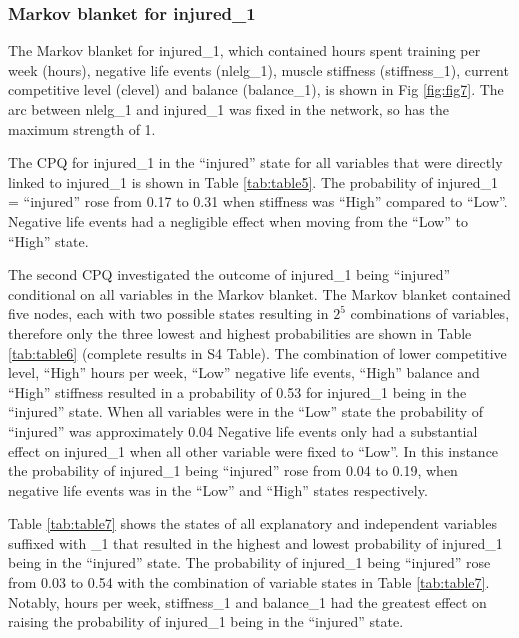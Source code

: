 \documentclass[
]{frontiersHLTH}
\begin{document}
\hypertarget{markov-blanket-for-injured_1}{%
\subsubsection{Markov blanket for
injured\_1}\label{markov-blanket-for-injured_1}}

The Markov blanket for injured\_1, which contained hours spent training
per week (hours), negative life events (nlelg\_1), muscle stiffness
(stiffness\_1), current competitive level (clevel) and balance
(balance\_1), is shown in Fig \ref{fig:fig7}. The arc between nlelg\_1
and injured\_1 was fixed in the network, so has the maximum strength of
1.

The CPQ for injured\_1 in the ``injured'' state for all variables that
were directly linked to injured\_1 is shown in Table \ref{tab:table5}.
The probability of injured\_1 = ``injured'' rose from 0.17 to 0.31 when
stiffness was ``High'' compared to ``Low''. Negative life events had a
negligible effect when moving from the ``Low'' to ``High'' state.

The second CPQ investigated the outcome of injured\_1 being ``injured''
conditional on all variables in the Markov blanket. The Markov blanket
contained five nodes, each with two possible states resulting in \(2^5\)
combinations of variables, therefore only the three lowest and highest
probabilities are shown in Table \ref{tab:table6} (complete results in
S4 Table). The combination of lower competitive level, ``High'' hours
per week, ``Low'' negative life events, ``High'' balance and ``High''
stiffness resulted in a probability of 0.53 for injured\_1 being in the
``injured'' state. When all variables were in the ``Low'' state the
probability of ``injured'' was approximately 0.04 Negative life events
only had a substantial effect on injured\_1 when all other variable were
fixed to ``Low''. In this instance the probability of injured\_1 being
``injured'' rose from 0.04 to 0.19, when negative life events was in the
``Low'' and ``High'' states respectively.

Table \ref{tab:table7} shows the states of all explanatory and
independent variables suffixed with \_1 that resulted in the highest and
lowest probability of injured\_1 being in the ``injured'' state. The
probability of injured\_1 being ``injured'' rose from 0.03 to 0.54 with
the combination of variable states in Table \ref{tab:table7}. Notably,
hours per week, stiffness\_1 and balance\_1 had the greatest effect on
raising the probability of injured\_1 being in the ``injured'' state.
\end{document}

